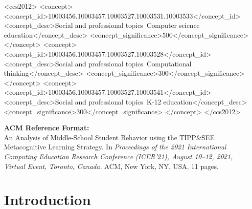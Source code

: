 \documentclass[sigconf,manuscript,review,anonymous]{acmart} %
\def\ts{TIPP\&SEE}
\begin{document}
\begin{CCSXML}
<ccs2012>
<concept>
<concept_id>10003456.10003457.10003527.10003531.10003533</concept_id>
<concept_desc>Social and professional topics~Computer science education</concept_desc>
<concept_significance>500</concept_significance>
</concept>
<concept>
<concept_id>10003456.10003457.10003527.10003528</concept_id>
<concept_desc>Social and professional topics~Computational thinking</concept_desc>
<concept_significance>300</concept_significance>
</concept>
<concept>
<concept_id>10003456.10003457.10003527.10003541</concept_id>
<concept_desc>Social and professional topics~K-12 education</concept_desc>
<concept_significance>300</concept_significance>
</concept>
</ccs2012>
\end{CCSXML}



\maketitle

{\fontsize{8pt}{8pt} \selectfont
\textbf{ACM Reference Format:} \\
An Analysis of Middle-School Student Behavior using the \ts{} Metacognitive Learning Strategy. In \textit{Proceedings
of the 2021 International Computing Education Research Conference (ICER’21), August 10–12, 2021, Virtual Event, Toronto, Canada.} ACM, New York, NY, USA, 11 pages. \ }

\section{Introduction}
\label{sec:objectives}
\end{document}
